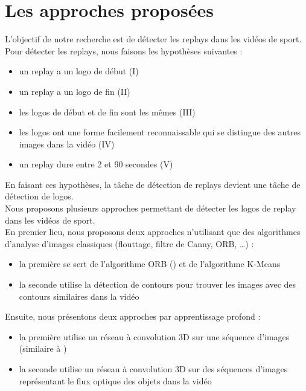 \documentclass[11pt]{article}
\begin{document}
\newpage
\section{Les approches proposées}
\label{sec:org6e35a77}
L'objectif de notre recherche est de détecter les replays dans les vidéos de sport.\\

Pour détecter les replays, nous faisons les hypothèses suivantes :\\
\begin{itemize}
\item un replay a un logo de début (I) \cite{Hao_Pan_2002} \\
\item un replay a un logo de fin (II) \cite{Hao_Pan_2002}\\
\item les logos de début et de fin sont les mêmes (III) \cite{Hao_Pan_2002}\\
\item les logos ont une forme facilement reconnaissable qui se distingue des  autres images dans la vidéo (IV)\\
\item un replay dure entre 2 et 90 secondes (V)\\
\end{itemize}

En faisant ces hypothèses, la tâche de détection de replays devient une tâche de détection de logos.\\

Nous proposons plusieurs approches permettant de détecter les logos de replay dans les vidéos de sport.\\
En premier lieu, nous proposons deux approches n'utilisant que des algorithmes d'analyse d'images classiques (flouttage, filtre de Canny, ORB, \ldots{}) :\\
\begin{itemize}
\item la première se sert de l'algorithme ORB (\cite{Rublee_2011}) et de l'algorithme K-Means\\
\item la seconde utilise la détection de contours pour trouver les images avec des contours similaires dans la vidéo\\
\end{itemize}
Ensuite, nous présentons deux approches par apprentissage profond :\\
\begin{itemize}
\item la première utilise un réseau à convolution 3D sur une séquence d'images (similaire à \cite{Tran_2015})\\
\item la seconde utilise un réseau à convolution 3D sur des séquences d'images représentant le flux optique des objets dans la vidéo\\
\end{itemize}
\end{document}
